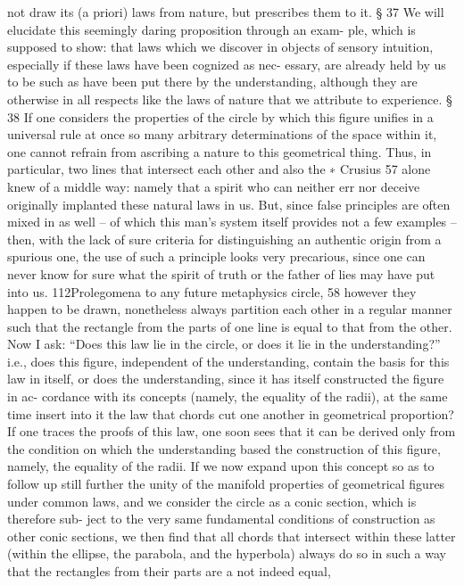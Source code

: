 not draw its (a priori) laws from nature, but prescribes them to it.
§ 37
We will elucidate this seemingly daring proposition through an exam-
ple, which is supposed to show: that laws which we discover in objects
of sensory intuition, especially if these laws have been cognized as nec-
essary, are already held by us to be such as have been put there by the
understanding, although they are otherwise in all respects like the laws
of nature that we attribute to experience.
§ 38
If one considers the properties of the circle by which this ﬁgure uniﬁes
in a universal rule at once so many arbitrary determinations of the space
within it, one cannot refrain from ascribing a nature to this geometrical
thing. Thus, in particular, two lines that intersect each other and also the
∗
Crusius 57 alone knew of a middle way: namely that a spirit who can neither
err nor deceive originally implanted these natural laws in us. But, since false
principles are often mixed in as well – of which this man’s system itself provides
not a few examples – then, with the lack of sure criteria for distinguishing an
authentic origin from a spurious one, the use of such a principle looks very
precarious, since one can never know for sure what the spirit of truth or the
father of lies may have put into us.
112Prolegomena to any future metaphysics
circle, 58 however they happen to be drawn, nonetheless always partition
each other in a regular manner such that the rectangle from the parts of
one line is equal to that from the other. Now I ask: “Does this law lie
in the circle, or does it lie in the understanding?” i.e., does this ﬁgure,
independent of the understanding, contain the basis for this law in itself,
or does the understanding, since it has itself constructed the ﬁgure in ac-
cordance with its concepts (namely, the equality of the radii), at the same
time insert into it the law that chords cut one another in geometrical
proportion? If one traces the proofs of this law, one soon sees that it can
be derived only from the condition on which the understanding based
the construction of this ﬁgure, namely, the equality of the radii. If we
now expand upon this concept so as to follow up still further the unity
of the manifold properties of geometrical ﬁgures under common laws,
and we consider the circle as a conic section, which is therefore sub-
ject to the very same fundamental conditions of construction as other
conic sections, we then ﬁnd that all chords that intersect within these
latter (within the ellipse, the parabola, and the hyperbola) always do so
in such a way that the rectangles from their parts are a not indeed equal,
